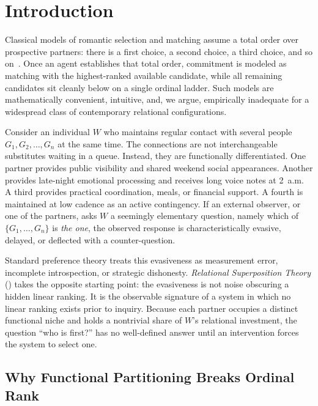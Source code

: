 \section{Introduction}
\label{sec:introduction}

Classical models of romantic selection and matching assume a total order over
prospective partners: there is a first choice, a second choice, a third choice,
and so on~\citep{gale1962college,roth1990two}. Once an agent establishes that
total order, commitment is modeled as matching with the highest-ranked available
candidate, while all remaining candidates sit cleanly below on a single ordinal
ladder. Such models are mathematically convenient, intuitive, and, we argue,
empirically inadequate for a widespread class of contemporary relational
configurations.

Consider an individual $W$ who maintains regular contact with several people
$G_1, G_2, \dots, G_n$ at the same time. The connections are not interchangeable
substitutes waiting in a queue. Instead, they are functionally differentiated.
One partner provides public visibility and shared weekend social appearances.
Another provides late-night emotional processing and receives long voice notes
at 2~a.m. A third provides practical coordination, meals, or financial support.
A fourth is maintained at low cadence as an active contingency. If an external
observer, or one of the partners, asks $W$ a seemingly elementary question, namely
which of $\{G_1, \dots, G_n\}$ is \emph{the one}, the observed response is
characteristically evasive, delayed, or deflected with a counter-question.

Standard preference theory treats this evasiveness as measurement error,
incomplete introspection, or strategic dishonesty. \emph{Relational Superposition
Theory} (\RST) takes the opposite starting point: the evasiveness is not noise
obscuring a hidden linear ranking. It is the observable signature of a system in
which no linear ranking exists prior to inquiry. Because each partner occupies a
distinct functional niche and holds a nontrivial share of $W$'s relational
investment, the question ``who is first?'' has no well-defined answer until an
intervention forces the system to select one.

\subsection{Why Functional Partitioning Breaks Ordinal Rank}
\label{subsec:intro-partition}

